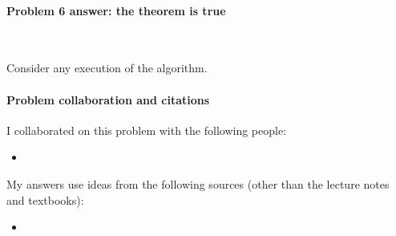 \paragraph{Problem 6 answer: the theorem is true}~

\begin{longFormProof}

  \step Consider any execution of the algorithm.

  \begin{blue}
    \step \REPLACEME 

    \step \REPLACEME

  \end{blue}

\end{longFormProof}


\vfill%

\paragraph{Problem  collaboration and citations}

I collaborated on this problem with the following people:
\begin{blue}
  \begin{itemize}
  \item \REPLACEME                    %
  \end{itemize}
\end{blue}

My answers use ideas from the following sources (other than the lecture notes and textbooks): 
\begin{blue}
  \begin{itemize}
  \item \REPLACEME                    %
  \end{itemize}
\end{blue}


